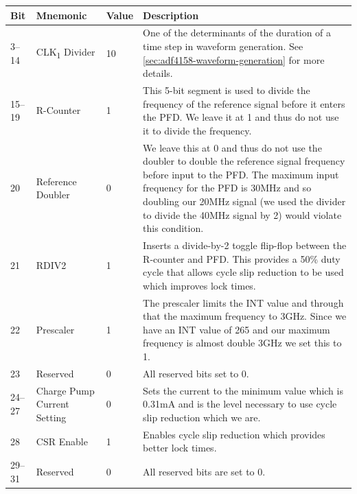 \label{tab:adf4158-reg-map-2}
\begin{tabularx}{\textwidth}{l l l X}
        \caption{R-DIVIDER REGISTER(R2) MAP} \\
        \toprule
        Bit & Mnemonic & Value & Description \\
        \midrule

        3--14  & CLK\textsubscript{1} Divider & 10 & One of the determinants of the duration of a
        time step in waveform generation. See \cref{sec:adf4158-waveform-generation} for more
        details.                                                                                                    \\
        15--19 & R-Counter                    & 1  & This 5-bit segment is used to divide the frequency of the reference
        signal
        before it enters the PFD\@. We leave it at 1 and thus do not use it to divide the frequency.                \\
        20     & Reference Doubler            & 0  & We leave this at 0 and thus do not use the doubler to double
        the reference signal frequency before input to the PFD\@. The maximum input frequency for
        the PFD is 30MHz and so doubling our 20MHz signal (we used the divider to divide the 40MHz
        signal by 2) would violate this condition.                                                                  \\
        21     & RDIV2                        & 1  & Inserts a divide-by-2 toggle flip-flop between the R-counter and
        PFD\@. This provides a 50\% duty cycle that allows cycle slip reduction to be used which
        improves lock times.                                                                                        \\
        22     & Prescaler                    & 1  & The prescaler limits the INT value and through that the maximum
        frequency to 3GHz. Since we have an INT value of 265 and our maximum frequency is almost
        double 3GHz we set this to 1.                                                                               \\
        23     & Reserved                     & 0  & All reserved bits set to 0.                                    \\
        24--27 & Charge Pump Current Setting  & 0  & Sets the current to the minimum value which is
        0.31mA and is the level necessary to use cycle slip reduction
        which we are.                                                                                               \\
        28     & CSR Enable                   & 1  & Enables cycle slip reduction which provides better lock times. \\
        29--31 & Reserved                     & 0  & All reserved bits are set to 0.                                \\

        \bottomrule
\end{tabularx}

